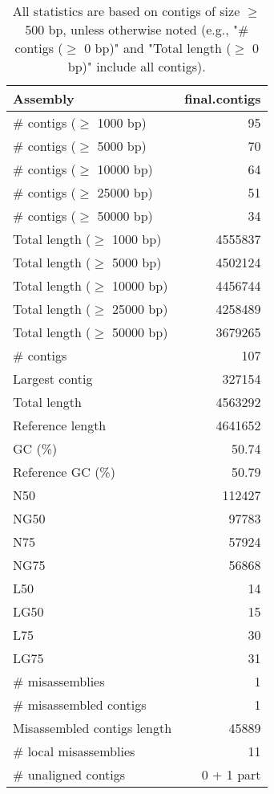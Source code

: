 \documentclass[12pt,a4paper]{article}
\begin{document}
\begin{table}[ht]
\begin{center}
\caption{All statistics are based on contigs of size $\geq$ 500 bp, unless otherwise noted (e.g., "\# contigs ($\geq$ 0 bp)" and "Total length ($\geq$ 0 bp)" include all contigs).}
\begin{tabular}{|l*{1}{|r}|}
\hline
Assembly & final.contigs \\ \hline
\# contigs ($\geq$ 1000 bp) & 95 \\ \hline
\# contigs ($\geq$ 5000 bp) & 70 \\ \hline
\# contigs ($\geq$ 10000 bp) & 64 \\ \hline
\# contigs ($\geq$ 25000 bp) & 51 \\ \hline
\# contigs ($\geq$ 50000 bp) & 34 \\ \hline
Total length ($\geq$ 1000 bp) & 4555837 \\ \hline
Total length ($\geq$ 5000 bp) & 4502124 \\ \hline
Total length ($\geq$ 10000 bp) & 4456744 \\ \hline
Total length ($\geq$ 25000 bp) & 4258489 \\ \hline
Total length ($\geq$ 50000 bp) & 3679265 \\ \hline
\# contigs & 107 \\ \hline
Largest contig & 327154 \\ \hline
Total length & 4563292 \\ \hline
Reference length & 4641652 \\ \hline
GC (\%) & 50.74 \\ \hline
Reference GC (\%) & 50.79 \\ \hline
N50 & 112427 \\ \hline
NG50 & 97783 \\ \hline
N75 & 57924 \\ \hline
NG75 & 56868 \\ \hline
L50 & 14 \\ \hline
LG50 & 15 \\ \hline
L75 & 30 \\ \hline
LG75 & 31 \\ \hline
\# misassemblies & 1 \\ \hline
\# misassembled contigs & 1 \\ \hline
Misassembled contigs length & 45889 \\ \hline
\# local misassemblies & 11 \\ \hline
\# unaligned contigs & 0 + 1 part \\ \hline

\end{tabular}
\end{center}
\end{table}
\end{document}

